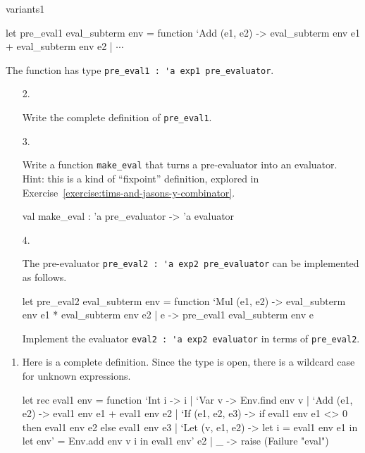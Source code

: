 \begin{exercise}{variants1}
\begin{ocaml}
let pre_eval1 eval_subterm env = function
   `Add (e1, e2) -> eval_subterm env e1 + eval_subterm env e2
 | $\cdots$
\end{ocaml}
%
The function has type \hbox{\lstinline$pre_eval1 : 'a exp1 pre_evaluator$}.

\begin{enumerate}
\item[2.]

Write the complete definition of \lstinline$pre_eval1$.

\item[3.]

Write a function \lstinline$make_eval$ that turns a pre-evaluator into
an evaluator.  Hint: this is a kind of ``fixpoint'' definition, explored
in Exercise~\ref{exercise:tims-and-jasons-y-combinator}.

\begin{ocaml}
val make_eval : 'a pre_evaluator -> 'a evaluator
\end{ocaml}

\item[4.]

The pre-evaluator \hbox{\lstinline$pre_eval2 : 'a exp2 pre_evaluator$}
can be implemented as follows.

\begin{ocaml}
let pre_eval2 eval_subterm env = function
   `Mul (e1, e2) -> eval_subterm env e1 * eval_subterm env e2
 | e -> pre_eval1 eval_subterm env e
\end{ocaml}
%
Implement the evaluator \hbox{\lstinline$eval2 : 'a exp2 evaluator$}
in terms of \hbox{\lstinline$pre_eval2$}.
\end{enumerate}

\begin{answer}\ifanswers
\begin{enumerate}
\item

Here is a complete definition.  Since the type is open, there is a
wildcard case for unknown expressions.

\begin{ocaml}
let rec eval1 env = function
   `Int i -> i
 | `Var v -> Env.find env v
 | `Add (e1, e2) -> eval1 env e1 + eval1 env e2
 | `If (e1, e2, e3) ->
      if eval1 env e1 <> 0
      then eval1 env e2
      else eval1 env e3
 | `Let (v, e1, e2) ->
      let i = eval1 env e1 in
      let env' = Env.add env v i in
      eval1 env' e2
 | _ ->
      raise (Failure "eval")
\end{ocaml}


\end{enumerate}
\end{answer}
\end{exercise}
